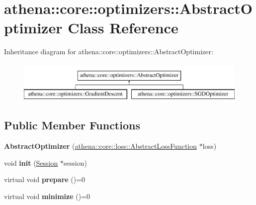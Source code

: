 \hypertarget{classathena_1_1core_1_1optimizers_1_1_abstract_optimizer}{}\section{athena\+:\+:core\+:\+:optimizers\+:\+:Abstract\+Optimizer Class Reference}
\label{classathena_1_1core_1_1optimizers_1_1_abstract_optimizer}
Inheritance diagram for athena\+:\+:core\+:\+:optimizers\+:\+:Abstract\+Optimizer\+:\begin{figure}[H]
\begin{center}
\leavevmode
\includegraphics[height=2.000000cm]{classathena_1_1core_1_1optimizers_1_1_abstract_optimizer}
\end{center}
\end{figure}
\subsection*{Public Member Functions}
\begin{DoxyCompactItemize}
\item 
\mbox{\label{classathena_1_1core_1_1optimizers_1_1_abstract_optimizer_a87422b9b479a84aa2b882e54e7ba22d5}} 
{\bfseries Abstract\+Optimizer} (\mbox{\hyperlink{classathena_1_1core_1_1loss_1_1_abstract_loss_function}{athena\+::core\+::loss\+::\+Abstract\+Loss\+Function}} $\ast$loss)
\item 
\mbox{\label{classathena_1_1core_1_1optimizers_1_1_abstract_optimizer_a4aaf186d6810a25cf54015ba23e0a809}} 
void {\bfseries init} (\mbox{\hyperlink{classathena_1_1core_1_1_session}{Session}} $\ast$session)
\item 
\mbox{\label{classathena_1_1core_1_1optimizers_1_1_abstract_optimizer_a1131df49e42aff2009ccd22621a6447e}} 
virtual void {\bfseries prepare} ()=0
\item 
\mbox{\label{classathena_1_1core_1_1optimizers_1_1_abstract_optimizer_ad0106d7566fd68761a502aa7bff24c68}} 
virtual void {\bfseries minimize} ()=0
\end{DoxyCompactItemize}

